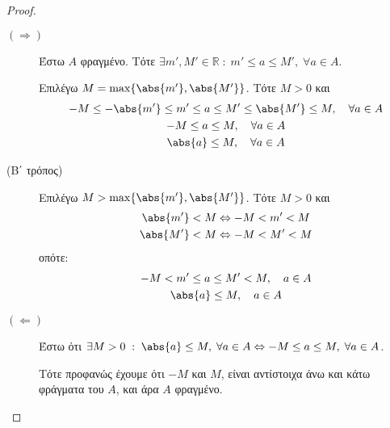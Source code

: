\documentclass[main.tex]{subfiles}
\begin{document}
\begin{proof}
\item {}
    \begin{description}
        \item [$ (\Rightarrow) $] Έστω $A$ φραγμένο. Τότε 
            $ \exists m',M' \in \mathbb{R} \; : \; m' \leq a \leq M', \; 
            \forall a \in A $.

            Επιλέγω $ M = \max \{ \abs{m'}, \abs{M'} \} $. Τότε $ M >0 $ και 
            \begin{gather*}
                -M \leq - \abs{m'} \leq m' \leq a \leq M' \leq \abs{M'} 
                \leq M, \quad \forall a \in A \\
                -M \leq a \leq M, \quad \forall a \in A \\
                \abs{a} \leq M, \quad \forall a \in A
            \end{gather*}

        \item [(Β΄ τρόπος)]
            Επιλέγω $ M > \max \{ \abs{m'}, \abs{M'} \} $. Τότε $ M >0 $ και 
            \begin{gather*}
                \abs{m'} < M \Leftrightarrow - M < m' < M \\
                \abs{M'} < M \Leftrightarrow -M < M' < M 
            \end{gather*}
            οπότε: 
            \begin{gather*}
                -M < m' \leq a \leq M' < M, \quad a \in A \\
                \abs{a} \leq M, \quad a \in A
            \end{gather*}


        \item [$ (\Leftarrow) $]
            Έστω ότι $ \exists M>0 \; : \; \abs{a} \leq M, \; \forall a \in 
            A \Leftrightarrow -M \leq a \leq M, \; \forall a \in A$. 

            Τότε προφανώς έχουμε ότι $-M $ και $ M $, 
            είναι αντίστοιχα άνω και κάτω φράγματα του $A$, και άρα $A$ 
            φραγμένο.
    \end{description} 
\end{proof}

\end{document}
